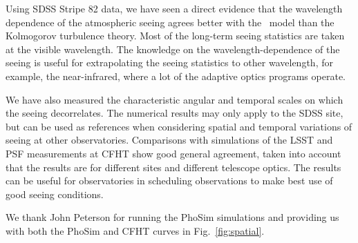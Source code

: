 
 
Using SDSS Stripe 82 data, we have seen a direct evidence that the
wavelength dependence of the atmospheric seeing agrees better with the
\vk~model than the Kolmogorov turbulence theory.
Most of the long-term seeing statistics are taken at the visible
wavelength. The knowledge on the wavelength-dependence of the seeing
is useful for extrapolating the seeing statistics to other
wavelength, for example, the near-infrared, where a lot of the
adaptive optics programs operate.


We have also measured 
the characteristic angular and temporal scales on which the seeing
decorrelates.
The numerical results may only apply to the SDSS site, but can be used
as references when considering spatial and temporal variations of
seeing at other observatories.
Comparisons with simulations of the LSST and PSF measurements at CFHT
show good general agreement, taken into account that the results are
for different sites and different telescope optics.
The results can be useful for observatories in scheduling
observations to make best use of good seeing conditions.

We thank John Peterson for running the PhoSim simulations and
providing us with both the PhoSim and CFHT curves in
Fig.~\ref{fig:spatial}.



 



